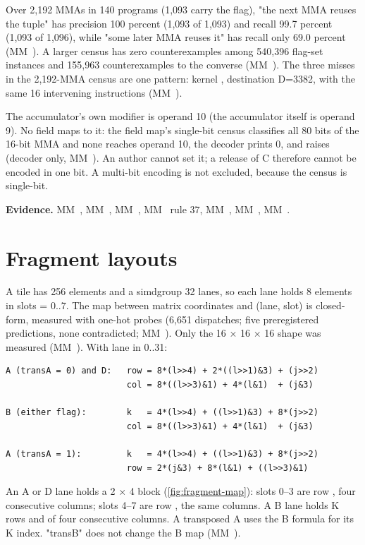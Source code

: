 Over 2,192 MMAs in 140 programs
(1,093 carry the flag), "the next MMA reuses the tuple" has precision 100 percent (1,093 of 1,093) and recall 99.7
percent (1,093 of 1,096), while "some later MMA reuses it" has recall only 69.0 percent (MM~). A larger census
has zero counterexamples among 540,396 flag-set instances and 155,963 counterexamples to the converse (MM~). The three
misses in the 2,192-MMA census are one pattern: kernel , destination D=3382, with the same 16 intervening
 instructions (MM~).

The accumulator's own modifier is operand 10 (the accumulator itself is operand 9). No field maps to it: the field
map's single-bit census classifies all 80 bits of the 16-bit MMA and none reaches operand 10, the decoder prints 0, and
 raises (decoder only, MM~). An author cannot set it; a release of C therefore cannot be
encoded in one bit. A multi-bit encoding is not excluded, because the census is single-bit.

\textbf{Evidence.} MM~, MM~, MM~, MM~ rule 37, MM~, MM~, MM~.

\section{Fragment layouts}\label{sec:fragment-layouts}

A tile has 256 elements and a simdgroup 32 lanes, so each lane holds 8 elements in slots  = 0..7. The map between
matrix coordinates and (lane, slot) is closed-form, measured with one-hot probes (6,651 dispatches; five preregistered
predictions, none contradicted; MM~). Only the 16 × 16 × 16 shape was measured (MM~). With lane
 in 0..31:

\begin{lstlisting}
A (transA = 0) and D:   row = 8*(l>>4) + 2*((l>>1)&3) + (j>>2)
                        col = 8*((l>>3)&1) + 4*(l&1)  + (j&3)

B (either flag):        k   = 4*(l>>4) + ((l>>1)&3) + 8*(j>>2)
                        col = 8*((l>>3)&1) + 4*(l&1)  + (j&3)

A (transA = 1):         k   = 4*(l>>4) + ((l>>1)&3) + 8*(j>>2)
                        row = 2*(j&3) + 8*(l&1) + ((l>>3)&1)
\end{lstlisting}

An A or D lane holds a 2 × 4 block (\cref{fig:fragment-map}): slots 0–3 are row , four consecutive columns; slots 4–7 are row , the
same columns. A B lane holds K rows  and  of four consecutive columns. A transposed A uses the B formula for
its K index. "transB" does not change the B map (MM~).

